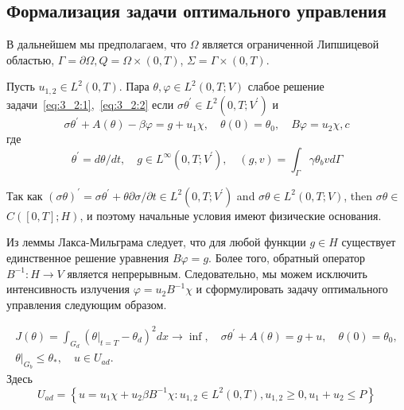 \subsection{Формализация задачи оптимального управления}\label{subsec:ch3:sec3:subsec2}

В дальнейшем мы предполагаем, что $\Omega $ является ограниченной Липшицевой областью,
$\Gamma =\partial \Omega, Q =\Omega \times(0, T)$, $\Sigma=\Gamma \times(0, T)$.

\begin{definition}
    Пусть $u_{1,2} \in L^{2}(0, T)$.
    Пара $\theta, \varphi \in L^{2}(0, T ; V)$ слабое решение задачи~\eqref{eq:3_2:1},~\eqref{eq:3_2:2} если
    $\sigma \theta^{\prime} \in L^{2}\left(0, T ; V^{\prime}\right)$ и
    \begin{equation}
        \label{eq:3_3:3}
        \sigma \theta^{\prime}+A(\theta)-\beta \varphi=g+u_{1} \chi,
        \quad \theta(0)=\theta_{0}, \quad B \varphi=u_{2} \chi,c
    \end{equation}
    где
    \[
        \theta^{\prime}=d \theta / d t, \quad g \in L^{\infty}\left(0, T ; V^{\prime}\right),
        \quad(g, v)=\int_{\Gamma} \gamma \theta_{b} v d \Gamma
    \]
\end{definition}

\begin{remark}
    Так как $(\sigma \theta)^{\prime}=\sigma \theta^{\prime}+\theta
    \partial \sigma / \partial t \in L^{2}\left(0, T ; V^{\prime}\right)$ and $\sigma
    \theta \in L^{2}(0, T ; V)$, then $\sigma \theta \in$ $C([0, T] ; H)$,
    и поэтому начальные условия имеют физические основания.
\end{remark}

Из леммы Лакса-Мильграма следует, что для любой функции $g \in H$ существует единственное
решение уравнения $B\varphi= g$.
Более того, обратный оператор $B^{-1}: H \rightarrow V$ является непрерывным.
Следовательно, мы можем исключить интенсивность излучения $\varphi=u_{2} B^{-1} \chi$
и сформулировать задачу оптимального управления следующим образом.

\begin{definition}
    [Задача $CP$]
    \[
        \begin{gathered}
            J(\theta)=\int_{G_{d}}\left(\left.\theta\right|_{t=T}
            - \theta_{d}\right)^{2} d x \rightarrow \inf,
            \quad \sigma \theta^{\prime}+A(\theta)=g+u, \quad \theta(0)=\theta_{0}, \\
            \left.\theta\right|_{G_{b}} \leq \theta_{*}, \quad u \in U_{a d}.
        \end{gathered}
    \]
    Здесь
    \[
        U_{a d}=\left\{u=u_{1} \chi+u_{2} \beta B^{-1} \chi: u_{1,2} \in L^{2}(0, T), u_{1,2}
        \geq 0, u_{1}+u_{2} \leq P\right\}
    \]
\end{definition}

